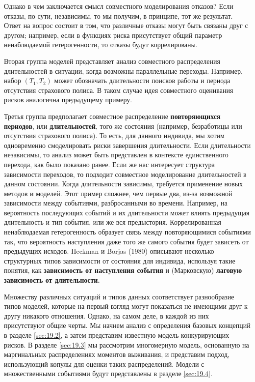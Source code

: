 Однако в чем заключается смысл совместного моделирования отказов? Если отказы, по сути, независимы, то мы получим, в принципе, тот же результат. Ответ на вопрос состоит в том, что различные отказы могут быть связаны друг с другом; например, если в функциях риска присутствует общий параметр ненаблюдаемой гетерогенности, то отказы будут коррелированы.


Вторая группа моделей представляет анализ совместного распределения длительностей в ситуации, когда возможны параллельные переходы. Например, набор $(T_1, T_2)$ может обозначать длительности поисков работы и периода отсутствия страхового полиса. В таком случае идея совместного оценивания рисков аналогична предыдущему примеру.

Третья группа предполагает совместное распределение \textbf{повторяющихся периодов}, или \textbf{длительностей},
того же состояния (например, безработицы или отсутствия страхового полиса). То есть, для данного индивида, мы хотим одновременно смоделировать риски завершения длительности. Если длительности независимы, то анализ может быть представлен в контексте единственного перехода, как было показано ранее. Если же нас интересует структура зависимости переходов, то подходит совместное моделирование длительностей в данном состоянии. Когда длительности зависимы, требуется применение новых методов и моделей. Этот пример сложнее, чем первые два, из-за возможной зависимости между событиями, разбросанными во времени. Например, на вероятность последующих событий и их длительности может влиять предыдущая длительность и тип события, или же вся предыстория. Коррелированная ненаблюдаемая гетерогенность образует связь между повторяющимися событиями так, что вероятность наступления даже того же самого события будет зависеть от предыдущих исходов. Heckman и Borjas (1980) описывают несколько структурных типов зависимости от состояния для индивида, используя такие понятия, как \textbf{зависимость от наступления события} и (Марковскую) \textbf{лаговую зависимость от длительности.}

Множеству различных ситуаций и типов данных соответствует разнообразие типов моделей, которые на первый взгляд могут показаться не имеющими друг к другу никакого отношения. Однако, на самом деле, в каждой из них присутствуют общие черты. Мы начнем анализ с определения базовых концепций в разделе \ref{sec:19.2}, а затем представим известную модель конкурирующих рисков. В разделе \ref{sec:19.3} мы рассмотрим многомерную модель, основанную на маргинальных распределениях моментов выживания, и представим подход, использующий копулы для оценки таких распределений. Модели с множественными событиями будут представлены в разделе \ref{sec:19.4}.




